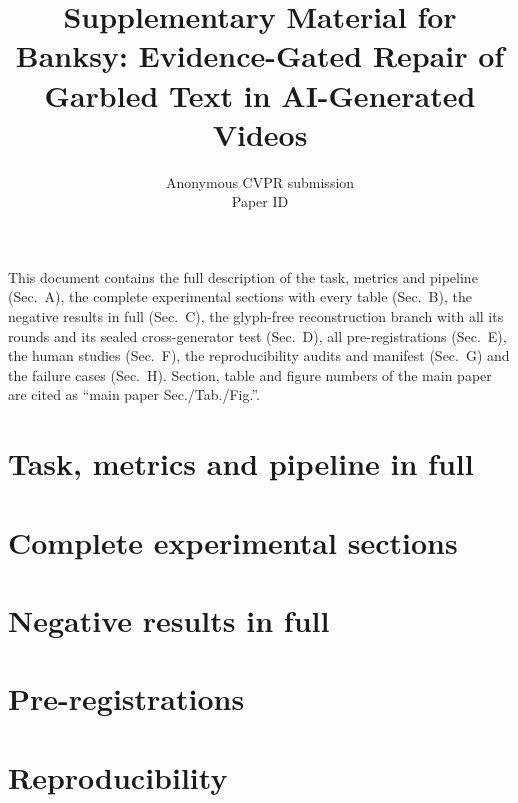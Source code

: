 \documentclass[10pt,twocolumn,letterpaper]{article}
\title{Supplementary Material for\\Banksy: Evidence-Gated Repair of Garbled Text in AI-Generated Videos}
\author{Anonymous CVPR submission\\
Paper ID \paperID}
\begin{document}
\maketitle

\noindent This document contains the full description of the task, metrics and pipeline (Sec.~A), the complete experimental sections with every table (Sec.~B), the negative results in full (Sec.~C), the glyph-free reconstruction branch with all its rounds and its sealed cross-generator test (Sec.~D), all pre-registrations (Sec.~E), the human studies (Sec.~F), the reproducibility audits and manifest (Sec.~G) and the failure cases (Sec.~H). Section, table and figure numbers of the main paper are cited as ``main paper Sec./Tab./Fig.''.

\section{Task, metrics and pipeline in full}
\label{sec:supp_full}





\section{Complete experimental sections}
\label{sec:supp_exp}








\section{Negative results in full}
\label{sec:supp_neg}






\section{Pre-registrations}
\label{sec:supp_prereg_all}




\section{Reproducibility}
\label{sec:supp_repro}






{
    \small
    
    
}
\end{document}
